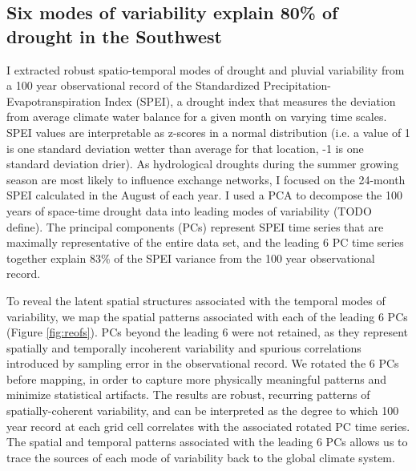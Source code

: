 \documentclass[fleqn,10pt]{wlscirep}
\begin{document}
\subsection*{Six modes of variability explain 80\% of drought in the Southwest}
I extracted robust spatio-temporal modes of drought and pluvial variability from a 100 year observational record of the Standardized Precipitation-Evapotranspiration Index (SPEI), a drought index that measures the deviation from average climate water balance for a given month on varying time scales. SPEI values are interpretable as z-scores in a normal distribution (i.e. a value of 1 is one standard deviation wetter than average for that location, -1 is one standard deviation drier). As hydrological droughts during the summer growing season are most likely to influence exchange networks, I focused on the 24-month SPEI calculated in the August of each year. I used a PCA to decompose the 100 years of space-time drought data into leading modes of variability (TODO define). The principal components (PCs) represent SPEI time series that are maximally representative of the entire data set, and the leading 6 PC time series together explain 83\% of the SPEI variance from the 100 year observational record. 

To reveal the latent spatial structures associated with the temporal modes of variability, we map the spatial patterns associated with each of the leading 6 PCs (Figure \ref{fig:reofs}). PCs beyond the leading 6 were not retained, as they represent spatially and temporally incoherent variability and spurious correlations introduced by sampling error in the observational record. We rotated the 6 PCs before mapping, in order to capture more physically meaningful patterns and minimize statistical artifacts. The results are robust, recurring patterns of spatially-coherent variability, and can be interpreted as the degree to which 100 year record at each grid cell correlates with the associated rotated PC time series. The spatial and temporal patterns associated with the leading 6 PCs allows us to trace the sources of each mode of variability back to the global climate system.

\end{document}
